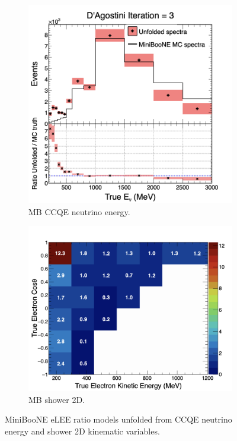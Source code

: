 \begin{figure}[H]
    \centering
    \begin{subfigure}{0.49\linewidth}
        \includegraphics[width=\linewidth]{technote/SignalModel/Figures/NuE_model.png}
        \caption{MB CCQE neutrino energy.}\label{fig:MB_ratio_a}
    \end{subfigure}
    \begin{subfigure}{0.5\linewidth}
        \includegraphics[width=\linewidth]{technote/SignalModel/Figures/Shw2D_model.png}
        \caption{MB shower 2D.}\label{fig:MB_ratio_b}
    \end{subfigure}
    \caption{MiniBooNE eLEE ratio models unfolded from CCQE neutrino energy and shower 2D kinematic variables.}
    \label{fig:MB_ratio}
\end{figure}

